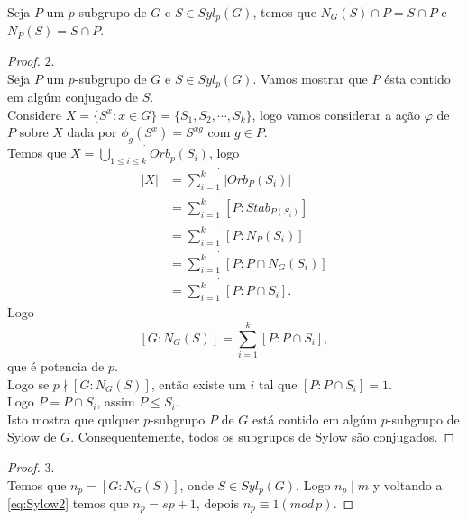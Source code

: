 \begin{corollary}
  Seja $P$ um $p$-subgrupo de $G$ e $S\in Syl_{p}(G)$, temos que $N_{G}(S)\cap P=S\cap P$ e $N_{P}(S)=S\cap P$. 
\end{corollary}
\begin{proof} 
  $2$.\\
  Seja $P$ um $p$-subgrupo de $G$ e $S\in Syl_{p}(G)$. Vamos mostrar que $P$ ésta contido em algúm conjugado de $S$.\\
  Considere $X=\{S^{x}:x\in G\}=\{S_1,S_2,\cdots,S_k\}$, logo vamos considerar a ação $\varphi$ de $P$ sobre $X$ dada por $\phi_{g}(S^{x})=S^{xg}$ com $g\in P$.\\
  Temos que $X=\dot{\bigcup_{1\leq i\leq k}}Orb_{p}(S_i)$, logo
  \begin{align*}
    |X|&=\dot{\sum_{i=1}^{k}}|Orb_{P}(S_i)|\\
    &=\dot{\sum_{i=1}^{k}}[P:Stab_{{P}(S_i)}]\\
    &=\dot{\sum_{i=1}^{k}}[P:N_{P}(S_i)]\\
    &=\dot{\sum_{i=1}^{k}}[P:P\cap N_{G}(S_i)]\\
    &=\dot{\sum_{i=1}^{k}}[P:P\cap S_i].
  \end{align*}
  Logo
  \begin{equation}\label{eq:Sylow2}
    [G:N_{G}(S)]=\sum_{i=1}^{k}[P:P\cap S_i],
  \end{equation}
  que é potencia de $p$.\\
  Logo se $p\nmid [G:N_{G}(S)]$, então existe um $i$ tal que $[P:P\cap S_i]=1$.\\ 
  Logo $P=P\cap S_i$, assim $P\leq S_i$.\\
  Isto mostra que qulquer $p$-subgrupo $P$ de $G$ está contido em algúm $p$-subgrupo de Sylow de $G$. Consequentemente, todos os subgrupos de Sylow são conjugados. 
\end{proof}
\begin{proof} 
  $3$.\\
  Temos que $n_p=[G:N_{G}(S)]$, onde $S\in Syl_{p}(G)$. Logo $n_{p}\mid m$ y voltando a \eqref{eq:Sylow2} temos que $n_p=sp+1$, depois $n_{p}\equiv 1(mod\,p)$.
\end{proof}
